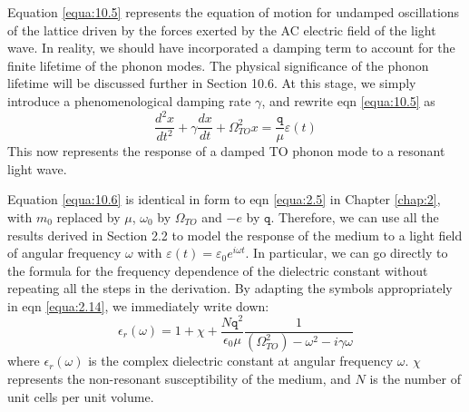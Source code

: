 \documentclass[12pt]{book}
\begin{document}
{Equation \ref{equa:10.5} represents the equation of motion for undamped oscillations of the lattice driven by the forces exerted by the AC electric field of the light wave. In reality, we should have incorporated a damping term to account for the finite lifetime of the phonon modes. The physical significance of the phonon lifetime will be discussed further in Section 10.6. At this stage, we simply introduce a phenomenological damping rate $\gamma$, and rewrite eqn \ref{equa:10.5} as
\begin{equation}\label{equa:10.6}
  \frac{d^2x}{dt^2}+\gamma\frac{dx}{dt}+\Omega_{TO}^2x=\frac{\texttt{q}}{\mu}\varepsilon(t)
\end{equation}
This now represents the response of a damped TO phonon mode to a resonant light wave.

Equation \ref{equa:10.6} is identical in form to eqn \ref{equa:2.5} in Chapter \ref{chap:2}, with $m_0$ replaced by $\mu$, $\omega_0$ by $\Omega_{TO}$ and $-e$ by $\texttt{q}$. Therefore, we can use all the results derived in Section 2.2 to model the response of the medium to a light field of angular frequency $\omega$ with $\varepsilon(t) = \varepsilon_0e^{i\omega t}$. In particular, we can go directly to the formula for the frequency dependence of the dielectric constant without repeating all the steps in the derivation. By adapting the symbols appropriately in eqn \ref{equa:2.14}, we immediately write down:
\begin{equation}\label{equa:10.7}
  \epsilon_r(\omega)=1+\chi+\frac{N\texttt{q}^2}{\epsilon_0\mu}\frac{1}{(\Omega_{TO}^2)-\omega^2-i\gamma\omega}
\end{equation}
where $\epsilon_r(\omega)$ is the complex dielectric constant at angular frequency $\omega$. $\chi$ represents the non-resonant susceptibility of the medium, and $N$ is the number of unit cells per unit volume.

}
\end{document}
